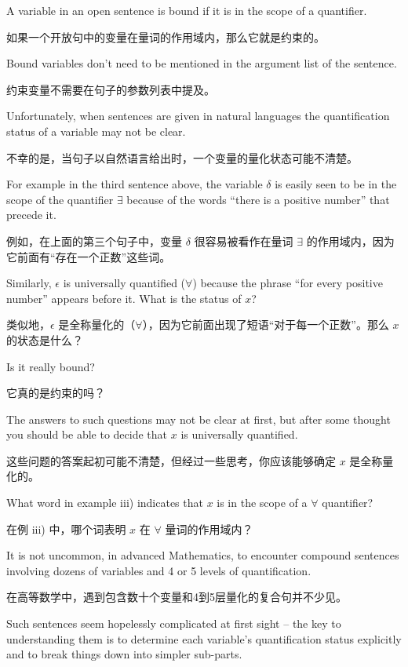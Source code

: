 A variable in an open sentence is bound if it is in the
scope of a quantifier.

如果一个开放句中的变量在量词的作用域内，那么它就是约束的。

Bound variables don't need to be mentioned
in the argument list of the sentence.

约束变量不需要在句子的参数列表中提及。

Unfortunately, when sentences are
given in natural languages the quantification status of a variable may 
not be clear.

不幸的是，当句子以自然语言给出时，一个变量的量化状态可能不清楚。

For example in the third sentence above, the variable $\delta$
is easily seen to be in the scope of the quantifier $\exists$ because of the
words ``there is a positive number'' that precede it.

例如，在上面的第三个句子中，变量 $\delta$ 很容易被看作在量词 $\exists$ 的作用域内，因为它前面有“存在一个正数”这些词。

Similarly, $\epsilon$
is universally quantified ($\forall$) because the phrase ``for every positive
number'' appears before it.  What is the status of $x$?

类似地，$\epsilon$ 是全称量化的（$\forall$），因为它前面出现了短语“对于每一个正数”。那么 $x$ 的状态是什么？

Is it really bound?

它真的是约束的吗？

The answers to such questions may not be clear at first, but after some 
thought you should be able to decide that $x$ is universally quantified.

这些问题的答案起初可能不清楚，但经过一些思考，你应该能够确定 $x$ 是全称量化的。

\begin{exer} What word in example iii) indicates that $x$ is in the
scope of a $\forall$ quantifier?

在例 iii) 中，哪个词表明 $x$ 在 $\forall$ 量词的作用域内？
\end{exer}

It is not uncommon, in advanced Mathematics, to encounter compound sentences
involving dozens of variables and 4 or 5 levels of quantification.

在高等数学中，遇到包含数十个变量和4到5层量化的复合句并不少见。

Such 
sentences seem hopelessly complicated at first sight -- the key to 
understanding them is to determine each variable's quantification status
explicitly and to break things down into simpler sub-parts.

